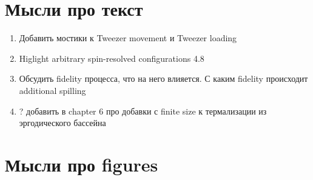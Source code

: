 

\section*{Мысли про текст}

\begin{enumerate}
	\item Добавить мостики к Tweezer movement и Tweezer loading
	\item Higlight arbitrary spin-resolved configurations 4.8
	\item Обсудить fidelity процесса, что на него влияется. С каким fidelity происходит additional spilling
	\item ? добавить в chapter 6 про добавки с finite size к термализации из эргодического бассейна
	
	



\end{enumerate}



\section*{Мысли про figures}


